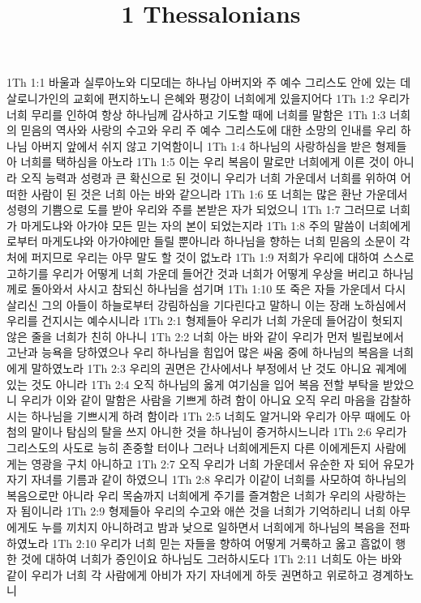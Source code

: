 

\title{1 Thessalonians}

1Th 1:1  바울과 실루아노와 디모데는 하나님 아버지와 주 예수 그리스도 안에 있는 데살로니가인의 교회에 편지하노니 은혜와 평강이 너희에게 있을지어다
1Th 1:2  우리가 너희 무리를 인하여 항상 하나님께 감사하고 기도할 때에 너희를 말함은
1Th 1:3  너희의 믿음의 역사와 사랑의 수고와 우리 주 예수 그리스도에 대한 소망의 인내를 우리 하나님 아버지 앞에서 쉬지 않고 기억함이니
1Th 1:4  하나님의 사랑하심을 받은 형제들아 너희를 택하심을 아노라
1Th 1:5  이는 우리 복음이 말로만 너희에게 이른 것이 아니라 오직 능력과 성령과 큰 확신으로 된 것이니 우리가 너희 가운데서 너희를 위하여 어떠한 사람이 된 것은 너희 아는 바와 같으니라
1Th 1:6  또 너희는 많은 환난 가운데서 성령의 기쁨으로 도를 받아 우리와 주를 본받은 자가 되었으니
1Th 1:7  그러므로 너희가 마게도냐와 아가야 모든 믿는 자의 본이 되었는지라
1Th 1:8  주의 말씀이 너희에게로부터 마게도냐와 아가야에만 들릴 뿐아니라 하나님을 향하는 너희 믿음의 소문이 각처에 퍼지므로 우리는 아무 말도 할 것이 없노라
1Th 1:9  저희가 우리에 대하여 스스로 고하기를 우리가 어떻게 너희 가운데 들어간 것과 너희가 어떻게 우상을 버리고 하나님께로 돌아와서 사시고 참되신 하나님을 섬기며
1Th 1:10  또 죽은 자들 가운데서 다시 살리신 그의 아들이 하늘로부터 강림하심을 기다린다고 말하니 이는 장래 노하심에서 우리를 건지시는 예수시니라
1Th 2:1  형제들아 우리가 너희 가운데 들어감이 헛되지 않은 줄을 너희가 친히 아나니
1Th 2:2  너희 아는 바와 같이 우리가 먼저 빌립보에서 고난과 능욕을 당하였으나 우리 하나님을 힘입어 많은 싸움 중에 하나님의 복음을 너희에게 말하였노라
1Th 2:3  우리의 권면은 간사에서나 부정에서 난 것도 아니요 궤계에 있는 것도 아니라
1Th 2:4  오직 하나님의 옳게 여기심을 입어 복음 전할 부탁을 받았으니 우리가 이와 같이 말함은 사람을 기쁘게 하려 함이 아니요 오직 우리 마음을 감찰하시는 하나님을 기쁘시게 하려 함이라
1Th 2:5  너희도 알거니와 우리가 아무 때에도 아첨의 말이나 탐심의 탈을 쓰지 아니한 것을 하나님이 증거하시느니라
1Th 2:6  우리가 그리스도의 사도로 능히 존중할 터이나 그러나 너희에게든지 다른 이에게든지 사람에게는 영광을 구치 아니하고
1Th 2:7  오직 우리가 너희 가운데서 유순한 자 되어 유모가 자기 자녀를 기름과 같이 하였으니
1Th 2:8  우리가 이같이 너희를 사모하여 하나님의 복음으로만 아니라 우리 목숨까지 너희에게 주기를 즐겨함은 너희가 우리의 사랑하는 자 됨이니라
1Th 2:9  형제들아 우리의 수고와 애쓴 것을 너희가 기억하리니 너희 아무에게도 누를 끼치지 아니하려고 밤과 낮으로 일하면서 너희에게 하나님의 복음을 전파하였노라
1Th 2:10  우리가 너희 믿는 자들을 향하여 어떻게 거룩하고 옳고 흠없이 행한 것에 대하여 너희가 증인이요 하나님도 그러하시도다
1Th 2:11  너희도 아는 바와 같이 우리가 너희 각 사람에게 아비가 자기 자녀에게 하듯 권면하고 위로하고 경계하노니

